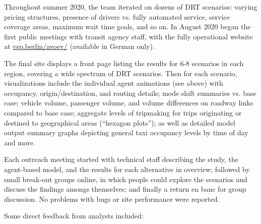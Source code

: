 Throughout summer 2020, the team iterated on dozens of DRT scenarios: varying pricing structures, presence of drivers vs. fully automated service, service coverage areas, maximum wait time goals, and so on. In August 2020 began the first public meetings with transit agency staff, with the fully operational website at \href{https://vsp.berlin/avoev}{vsp.berlin/avoev/} (available in German only).

The final site displays a front page listing the results for 6-8 scenarios in each region, covering a wide spectrum of DRT scenarios. Then for each scenario, visualizations include the individual agent animations (see above) with occupancy, origin/destination, and routing details; mode shift summaries vs. base case; vehicle volume, passenger volume, and volume differences on roadway links compared to base case; aggregate levels of tripmaking for trips originating or destined to geographical areas (``hexagon plots''); as well as detailed model output summary graphs depicting general taxi occupancy levels by time of day and more.

Each outreach meeting started with technical staff describing the study, the agent-based model, and the results for each alternative in overview; followed by small break-out groups online, in which people could explore the scenarios and discuss the findings amongs themselves; and finally a return en banc for group discussion. No problems with bugs or site performance were reported.

Some direct feedback from analysts included:

